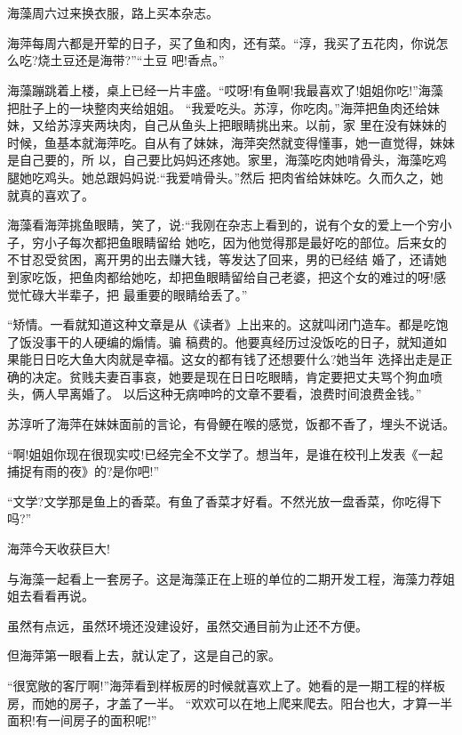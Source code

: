 \documentclass[11pt,a4paper,onecolumn]{article}
\begin{document}
\section[\thesection]{}

海藻周六过来换衣服，路上买本杂志。

海萍每周六都是开荤的日子，买了鱼和肉，还有菜。``淳，我买了五花肉，你说怎么吃?烧土豆还是海带?''``土豆
吧!香点。''

海藻蹦跳着上楼，桌上已经一片丰盛。``哎呀!有鱼啊!我最喜欢了!姐姐你吃!''海藻把肚子上的一块整肉夹给姐姐。
``我爱吃头。苏淳，你吃肉。''海萍把鱼肉还给妹妹，又给苏淳夹两块肉，自己从鱼头上把眼睛挑出来。以前，家
里在没有妹妹的时候，鱼基本就海萍吃。自从有了妹妹，海萍突然就变得懂事，她一直觉得，妹妹是自己要的，所
以，自己要比妈妈还疼她。家里，海藻吃肉她啃骨头，海藻吃鸡腿她吃鸡头。她总跟妈妈说:``我爱啃骨头。''然后
把肉省给妹妹吃。久而久之，她就真的喜欢了。

海藻看海萍挑鱼眼睛，笑了，说:``我刚在杂志上看到的，说有个女的爱上一个穷小子，穷小子每次都把鱼眼睛留给
她吃，因为他觉得那是最好吃的部位。后来女的不甘忍受贫困，离开男的出去赚大钱，等发达了回来，男的已经结
婚了，还请她到家吃饭，把鱼肉都给她吃，却把鱼眼睛留给自己老婆，把这个女的难过的呀!感觉忙碌大半辈子，把
最重要的眼睛给丢了。''

``矫情。一看就知道这种文章是从《读者》上出来的。这就叫闭门造车。都是吃饱了饭没事干的人硬编的煽情。骗
稿费的。他要真经历过没饭吃的日子，就知道如果能日日吃大鱼大肉就是幸福。这女的都有钱了还想要什么?她当年
选择出走是正确的决定。贫贱夫妻百事哀，她要是现在日日吃眼睛，肯定要把丈夫骂个狗血喷头，俩人早离婚了。
以后这种无病呻吟的文章不要看，浪费时间浪费金钱。''

苏淳听了海萍在妹妹面前的言论，有骨鲠在喉的感觉，饭都不香了，埋头不说话。

``啊!姐姐你现在很现实哎!已经完全不文学了。想当年，是谁在校刊上发表《一起捕捉有雨的夜》的?是你吧!''

``文学?文学那是鱼上的香菜。有鱼了香菜才好看。不然光放一盘香菜，你吃得下吗?''

海萍今天收获巨大!

与海藻一起看上一套房子。这是海藻正在上班的单位的二期开发工程，海藻力荐姐姐去看看再说。

虽然有点远，虽然环境还没建设好，虽然交通目前为止还不方便。

但海萍第一眼看上去，就认定了，这是自己的家。

``很宽敞的客厅啊!''海萍看到样板房的时候就喜欢上了。她看的是一期工程的样板房，而她的房子，才盖了一半。
``欢欢可以在地上爬来爬去。阳台也大，才算一半面积!有一间房子的面积呢!''
\end{document}
